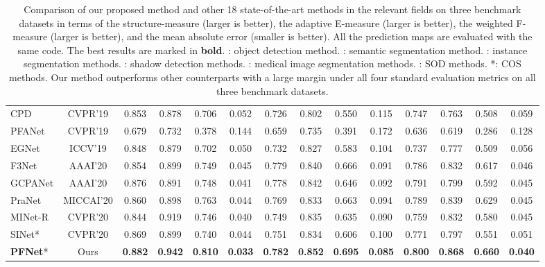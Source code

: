 \documentclass[final]{cvpr}
\begin{document}
\begin{table*}[t]
\begin{tabular}{l|c|cccc|cccc|cccc}
		CPD \cite{wu2019cascaded_cpd}             & CVPR'19 & 0.853 & 0.878 & 0.706 & 0.052 & 0.726 & 0.802 & 0.550 & 0.115 & 0.747 & 0.763 & 0.508 & 0.059     \\
		PFANet \cite{zhao2019pyramid_pfan}           & CVPR'19 & 0.679 & 0.732 & 0.378 & 0.144 & 0.659 & 0.735 & 0.391 & 0.172 & 0.636 & 0.619 & 0.286 & 0.128     \\
		EGNet \cite{zhao2019egnet}           & ICCV'19 & 0.848 & 0.879 & 0.702 & 0.050 & 0.732 & 0.827 & 0.583 & 0.104 & 0.737 & 0.777 & 0.509 & 0.056     \\
		F3Net \cite{wei2019f3net}    & AAAI'20 & 0.854 & 0.899 & 0.749 & 0.045 & 0.779 & 0.840 & 0.666 & 0.091 & 0.786 & 0.832 & 0.617 & 0.046     \\
		GCPANet \cite{chen2020global_gcpanet}    & AAAI'20 & 0.876 & 0.891 & 0.748 & 0.041 & 0.778 & 0.842 & 0.646 & 0.092 & 0.791 & 0.799 & 0.592 & 0.045     \\
		PraNet \cite{fan2020pra_pranet}       & MICCAI'20 & 0.860 & 0.898 & 0.763 & 0.044 & 0.769 & 0.833 & 0.663 & 0.094 & 0.789 & 0.839 & 0.629 & 0.045     \\
		MINet-R \cite{Pang_2020_CVPR_minet}    & CVPR'20 & 0.844 & 0.919 & 0.746 & 0.040 & 0.749 & 0.835 & 0.635 & 0.090 & 0.759 & 0.832 & 0.580 & 0.045     \\
		SINet* \cite{Fan_2020_CVPR_sinet}           & CVPR'20 & 0.869 & 0.899 & 0.740 & 0.044 & 0.751 & 0.834 & 0.606 & 0.100 & 0.771 & 0.797 & 0.551 & 0.051     \\
		
\hline
		\textbf{PFNet}* & Ours
& \textbf{0.882} & \textbf{0.942} & \textbf{0.810} & \textbf{0.033}
		& \textbf{0.782} & \textbf{0.852} & \textbf{0.695} & \textbf{0.085}
		& \textbf{0.800} & \textbf{0.868} & \textbf{0.660} & \textbf{0.040} \\
		
		\hline
	\end{tabular}
\caption{Comparison of our proposed method and other 18 state-of-the-art methods in the relevant fields on three benchmark datasets in terms of the structure-measure  (larger is better),  the adaptive E-measure  (larger is better), the weighted F-measure  (larger is better), and the mean absolute error  (smaller is better). All the prediction maps are evaluated with the same code. The best results are marked in \textbf{bold}. : object detection method. : semantic segmentation method. : instance segmentation methods. : shadow detection methods. : medical image segmentation methods. : SOD methods. *: COS methods. Our method outperforms other counterparts with a large margin under all four standard evaluation metrics on all three benchmark datasets.}
\label{tab:comparison}
\end{table*}
\end{document}
